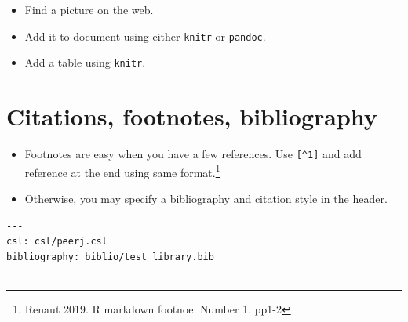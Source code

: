 \documentclass[]{article}
\let\rmarkdownfootnote\footnote%
\def\footnote{\protect\rmarkdownfootnote}
\begin{document}
\begin{itemize}
\item
  Find a picture on the web.
\item
  Add it to document using either \texttt{knitr} or \texttt{pandoc}.
\item
  Add a table using \texttt{knitr}.
\end{itemize}

\hypertarget{citations-footnotes-bibliography}{%
\section{Citations, footnotes,
bibliography}\label{citations-footnotes-bibliography}}

\begin{itemize}
\item
  Footnotes are easy when you have a few references. Use
  \texttt{{[}\^{}1{]}} and add reference at the end using same
  format.\footnote{Renaut 2019. R markdown footnoe. Number 1. pp1-2}
\item
  Otherwise, you may specify a bibliography and citation style in the
  header.
\end{itemize}

\texttt{-\/-\/-}\\
\texttt{csl:\ csl/peerj.csl}~\\
\texttt{bibliography:\ biblio/test\_library.bib}~\\
\texttt{-\/-\/-}
\end{document}
